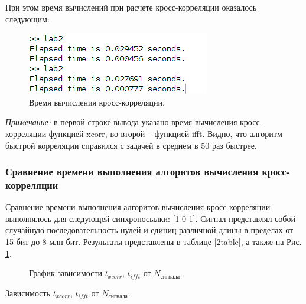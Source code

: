 \documentclass[a4paper,14pt]{extarticle}
\begin{document}
При этом время вычислений при расчете кросс-корреляции оказалось следующим:
\begin{figure}[H]
\centering
\includegraphics[scale=0.9]{pics/2elapsed.png}
\caption{Время вычисления кросс-корреляции.}
\end{figure}
\textit{Примечание:} в первой строке вывода указано время вычисления кросс-корреляции функцией xcorr, во второй -- функцией ifft. Видно, что алгоритм быстрой корреляции справился с задачей в среднем в 50 раз быстрее.

\subsubsection{Сравнение времени выполнения алгоритов вычисления кросс-корреляции}
Сравнение времени выполнения алгоритов вычисления кросс-корреляции выполнялось для следующей синхропосылки: [1 0 1]. Сигнал представлял собой случайную последовательность нулей и единиц различной длины в пределах от 15 бит до 8 млн бит. Результаты представлены в таблице \ref{2table}, а также на Рис. \ref{2graph_}.
\begin{figure}[H]
\centering
{} \hfill
\caption{График зависимости $t_{xcorr}$, $t_{ifft}$ от $N_\text{сигнала}$.}
\label{2graph_}
\end{figure}

\begin{table}[H]
\centering
\caption{Зависимость $t_{xcorr}$, $t_{ifft}$ от $N_\text{сигнала}$.}
   \label{2table}
\end{table}
\end{document}

